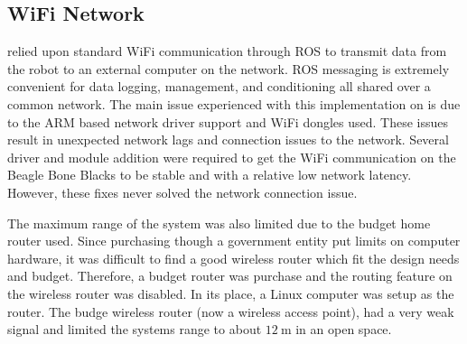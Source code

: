 \begin{appendices}
\subsection{WiFi Network}
\SB{} relied upon standard WiFi communication through ROS to transmit data from the robot to an external computer on the network.
ROS messaging is extremely convenient for data logging, management, and conditioning all shared over a common network.
The main issue experienced with this implementation on \SB{} is due to the ARM based network driver support and WiFi dongles used.
These issues result in unexpected network lags and connection issues to the network.
Several driver and module addition were required to get the WiFi communication on the Beagle Bone Blacks to be stable and with a relative low network latency.
However, these fixes never solved the network connection issue.

The maximum range of the system was also limited due to the budget home router used.
Since purchasing though a government entity put limits on computer hardware, it was difficult to find a good wireless router which fit the design needs and budget.
Therefore, a budget router was purchase and the routing feature on the wireless router was disabled.
In its place, a Linux computer was setup as the router.
The budge wireless router (now a wireless access point), had a very weak signal and limited the systems range to about \(\SI{12}{\meter}\) in an open space.


\end{appendices}